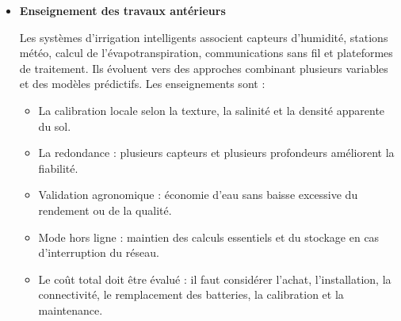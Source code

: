\begin{itemize}[label=$\bullet$]
   	\item \textbf{Enseignement des travaux antérieurs}

Les systèmes d’irrigation intelligents associent capteurs d’humidité, stations météo, calcul de l’évapotranspiration, communications sans fil et plateformes de traitement. 
Ils évoluent vers des approches combinant plusieurs variables et des modèles prédictifs. Les enseignements sont :  

    \begin{itemize}[label=$\circ$]
  	    \item La calibration locale selon la texture, la salinité et la densité apparente du sol.
  	
  	    \item La redondance : plusieurs capteurs et plusieurs profondeurs améliorent la fiabilité.
  	
        \item Validation agronomique : économie d’eau sans baisse excessive du rendement ou de la qualité.
    
        \item Mode hors ligne : maintien des calculs essentiels et du stockage en cas d’interruption du réseau.

        \item Le coût total doit être évalué : il faut considérer l’achat, l’installation, la connectivité, le remplacement des batteries, la calibration et la maintenance.
	\end{itemize}

\end{itemize}









   
 





    









 




